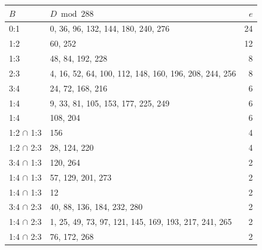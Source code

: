 \documentclass[12pt,twoside,leqno]{article}
\numberwithin{equation}{section}
\begin{document}
\begin{center}
\begin{tabular}{|l|l|r|}\hline
$B$ & $D\bmod 288$ & $e$ \\\hline
0:1& 0, 36, 96, 132, 144, 180, 240, 276 & 24 \\
1:2& 60, 252 & 12 \\
1:3& 48, 84, 192, 228 & 8 \\
2:3& 4, 16, 52, 64, 100, 112, 148, 160, 196, 208, 244, 256 & 8 \\
3:4& 24, 72, 168, 216 & 6 \\
1:4& 9, 33, 81, 105, 153, 177, 225, 249 & 6 \\
1:4& 108, 204 & 6 \\
1:2 $\cap$ 1:3 & 156 & 4 \\
1:2 $\cap$ 2:3 & 28, 124, 220 & 4 \\
3:4 $\cap$ 1:3 & 120, 264 & 2 \\
1:4 $\cap$ 1:3 & 57, 129, 201, 273 & 2 \\
1:4 $\cap$ 1:3 & 12 & 2 \\
3:4 $\cap$ 2:3 & 40, 88, 136, 184, 232, 280 & 2 \\
1:4 $\cap$ 2:3 & 1, 25, 49, 73, 97, 121, 145, 169, 193, 217, 241, 265 & 2 \\
1:4 $\cap$ 2:3 & 76, 172, 268 & 2 \\
\hline
\end{tabular}
\end{center}
\end{document}

